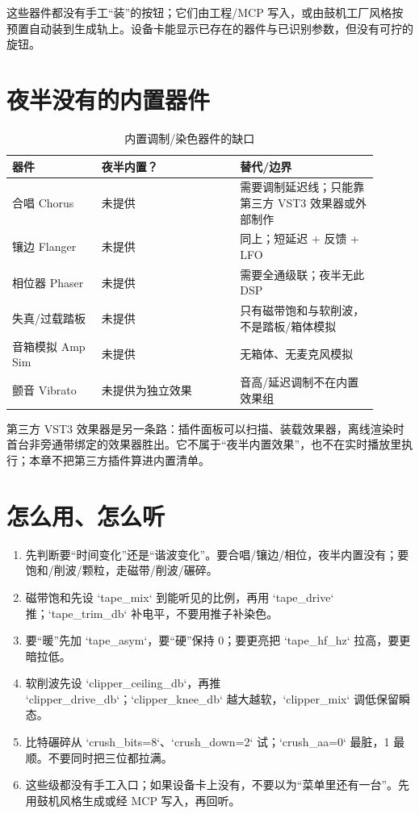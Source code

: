 这些器件都没有手工“装”的按钮；它们由工程/MCP 写入，或由鼓机工厂风格按预置自动装到生成轨上。设备卡能显示已存在的器件与已识别参数，但没有可拧的旋钮。

\section{夜半没有的内置器件}

\begin{table}[htbp]
\centering
\small
\begin{tabular}{@{}p{0.22\linewidth}p{0.34\linewidth}p{0.34\linewidth}@{}}
\hline
器件 & 夜半内置？ & 替代/边界 \\
\hline
合唱 Chorus & 未提供 & 需要调制延迟线；只能靠第三方 VST3 效果器或外部制作 \\
镶边 Flanger & 未提供 & 同上；短延迟 + 反馈 + LFO \\
相位器 Phaser & 未提供 & 需要全通级联；夜半无此 DSP \\
失真/过载踏板 & 未提供 & 只有磁带饱和与软削波，不是踏板/箱体模拟 \\
音箱模拟 Amp Sim & 未提供 & 无箱体、无麦克风模拟 \\
颤音 Vibrato & 未提供为独立效果 & 音高/延迟调制不在内置效果组 \\
\hline
\end{tabular}
\caption{内置调制/染色器件的缺口}
\label{tab:modulation-gaps}
\end{table}

第三方 VST3 效果器是另一条路：插件面板可以扫描、装载效果器，离线渲染时首台非旁通带绑定的效果器胜出。它不属于“夜半内置效果”，也不在实时播放里执行；本章不把第三方插件算进内置清单。

\section{怎么用、怎么听}

\begin{enumerate}
  \item 先判断要“时间变化”还是“谐波变化”。要合唱/镶边/相位，夜半内置没有；要饱和/削波/颗粒，走磁带/削波/碾碎。
  \item 磁带饱和先设 `tape_mix` 到能听见的比例，再用 `tape_drive` 推；`tape_trim_db` 补电平，不要用推子补染色。
  \item 要“暖”先加 `tape_asym`，要“硬”保持 0；要更亮把 `tape_hf_hz` 拉高，要更暗拉低。
  \item 软削波先设 `clipper_ceiling_db`，再推 `clipper_drive_db`；`clipper_knee_db` 越大越软，`clipper_mix` 调低保留瞬态。
  \item 比特碾碎从 `crush_bits=8`、`crush_down=2` 试；`crush_aa=0` 最脏，1 最顺。不要同时把三位都拉满。
  \item 这些级都没有手工入口；如果设备卡上没有，不要以为“菜单里还有一台”。先用鼓机风格生成或经 MCP 写入，再回听。
\end{enumerate}

